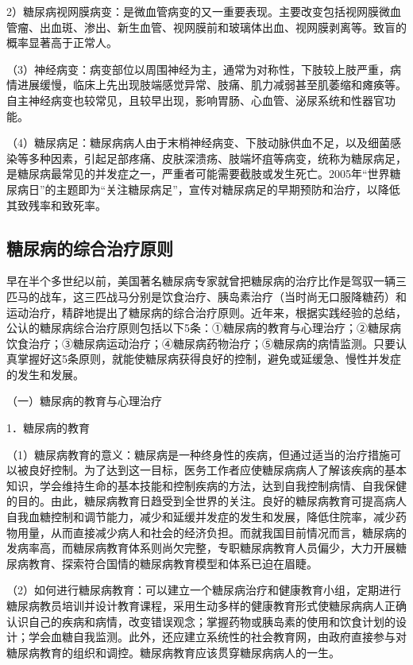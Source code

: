 2）糖尿病视网膜病变：是微血管病变的又一重要表现。主要改变包括视网膜微血管瘤、出血斑、渗出、新生血管、视网膜前和玻璃体出血、视网膜剥离等。致盲的概率显著高于正常人。

（3）神经病变：病变部位以周围神经为主，通常为对称性，下肢较上肢严重，病情进展缓慢，临床上先出现肢端感觉异常、肢痛、肌力减弱甚至肌萎缩和瘫痪等。自主神经病变也较常见，且较早出现，影响胃肠、心血管、泌尿系统和性器官功能。

（4）糖尿病足：糖尿病病人由于末梢神经病变、下肢动脉供血不足，以及细菌感染等多种因素，引起足部疼痛、皮肤深溃疡、肢端坏疽等病变，统称为糖尿病足，是糖尿病最常见的并发症之一，严重者可能需要截肢或发生死亡。2005年“世界糖尿病日”的主题即为“关注糖尿病足”，宣传对糖尿病足的早期预防和治疗，以降低其致残率和致死率。

\hypertarget{text00004.htmlux5cux23mllj23}{%
\subsection{糖尿病的综合治疗原则}\label{text00004.htmlux5cux23mllj23}}

早在半个多世纪以前，美国著名糖尿病专家就曾把糖尿病的治疗比作是驾驭一辆三匹马的战车，这三匹战马分别是饮食治疗、胰岛素治疗（当时尚无口服降糖药）和运动治疗，精辟地提出了糖尿病的综合治疗原则。近年来，根据实践经验的总结，公认的糖尿病综合治疗原则包括以下5条：①糖尿病的教育与心理治疗；②糖尿病饮食治疗；③糖尿病运动治疗；④糖尿病药物治疗；⑤糖尿病的病情监测。只要认真掌握好这5条原则，就能使糖尿病获得良好的控制，避免或延缓急、慢性并发症的发生和发展。

（一）糖尿病的教育与心理治疗

{1．糖尿病的教育}

（1）糖尿病教育的意义：糖尿病是一种终身性的疾病，但通过适当的治疗措施可以被良好控制。为了达到这一目标，医务工作者应使糖尿病病人了解该疾病的基本知识，学会维持生命的基本技能和控制疾病的方法，达到自我控制病情、自我保健的目的。由此，糖尿病教育日趋受到全世界的关注。良好的糖尿病教育可提高病人自我血糖控制和调节能力，减少和延缓并发症的发生和发展，降低住院率，减少药物用量，从而直接减少病人和社会的经济负担。而就我国目前情况而言，糖尿病的发病率高，而糖尿病教育体系则尚欠完整，专职糖尿病教育人员偏少，大力开展糖尿病教育、探索符合国情的糖尿病教育模型和体系已迫在眉睫。

（2）如何进行糖尿病教育：可以建立一个糖尿病治疗和健康教育小组，定期进行糖尿病教员培训并设计教育课程，采用生动多样的健康教育形式使糖尿病病人正确认识自己的疾病和病情，改变错误观念；掌握药物或胰岛素的使用和饮食计划的设计；学会血糖自我监测。此外，还应建立系统性的社会教育网，由政府直接参与对糖尿病教育的组织和调控。糖尿病教育应该贯穿糖尿病病人的一生。

